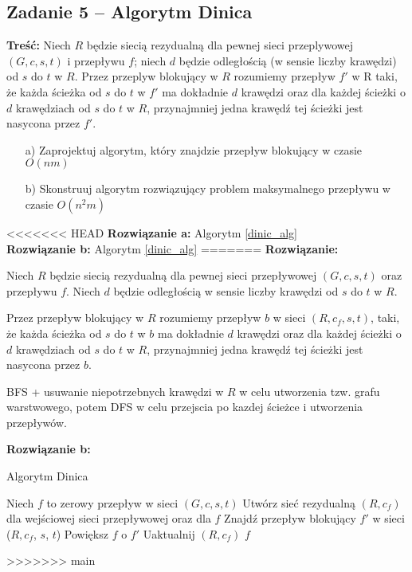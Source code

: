 \subsection{Zadanie 5 -- Algorytm Dinica}
\textbf{Treść: } Niech $R$ będzie siecią rezydualną 
dla pewnej sieci przeplywowej $(G, c, s, t)$ i przepływu $f$; 
niech $d$ będzie
odległością (w sensie liczby krawędzi) od $s$ do $t$ w $R$. 
Przez przeplyw blokujący w $R$ rozumiemy przepływ $f'$ w R taki,
że każda ścieżka od $s$ do $t$ w $f'$ ma dokładnie 
$d$ krawędzi oraz dla każdej ścieżki o $d$ krawędziach od $s$ do $t$ w $R$,
przynajmniej jedna krawędź tej ścieżki jest nasycona przez $f'$.
\begin{itemize}
	\item[a)] Zaprojektuj algorytm, który znajdzie przepływ blokujący w czasie $O(nm)$
	\item[b)] Skonstruuj algorytm rozwiązujący problem maksymalnego przepływu w czasie $O(n^2m)$
\end{itemize}
<<<<<<< HEAD
\textbf{Rozwiązanie a: } Algorytm \ref{dinic_alg} \\ 
\textbf{Rozwiązanie b: } Algorytm \ref{dinic_alg}
=======
\textbf{Rozwiązanie: }

\begin{defi}
	Niech $R$ będzie siecią rezydualną dla pewnej sieci przepływowej
	$(G, c, s, t)$ oraz przepływu $f$. Niech $d$ będzie odległością w sensie
	liczby krawędzi od $s$ do $t$ w $R$.
	
	Przez przepływ blokujący w $R$ rozumiemy przepływ $b$ w sieci
	$(R, c_f, s, t)$, taki, że każda ścieżka od $s$ do $t$ 
	w $b$ ma dokładnie $d$ krawędzi oraz dla każdej ścieżki o $d$ 
	krawędziach od $s$ do $t$ w $R$, przynajmniej jedna krawędź tej ścieżki
	jest nasycona przez $b$.
\end{defi}

BFS + usuwanie niepotrzebnych krawędzi w $R$ w celu utworzenia tzw. 
grafu warstwowego, potem DFS w celu przejscia po kazdej ścieżce
i utworzenia przepływów.

\textbf{Rozwiązanie b: }

\begin{algorithm}[H]
	\caption{Algorytm Dinica}
	\begin{algorithmic}[1]
		\State Niech $f$ to zerowy przepływ w sieci $(G,c,s,t)$
		\State Utwórz sieć rezydualną $(R, c_f)$ dla wejściowej 
		sieci przepływowej oraz dla $f$ 
		\State Znajdź przepływ blokujący $f'$ w sieci ($R, c_f$, $s$, $t$)
		\State Powiększ $f$ o $f'$
		\State Uaktualnij $(R, c_f)$
		\EndWhile
		\State \Return $f$
		\EndProcedure
	\end{algorithmic}
	\label{zad45}
\end{algorithm}
>>>>>>> main

